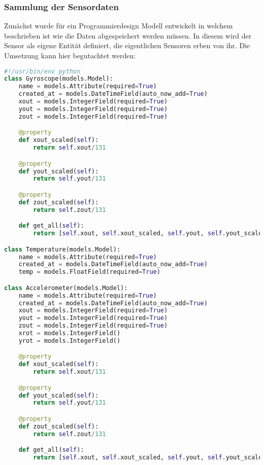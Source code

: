 \subsubsection{Sammlung der Sensordaten}

Zunächst wurde für ein Programmierdesign Modell entwickelt in welchem beschrieben ist wie die Daten abgespeichert werden müssen. In diesem wird der Sensor als eigene Entität definiert, die eigentlichen Sensoren erben von ihr. Die Umsetzung kann hier begutachtet werden:

\begin{lstlisting}[language=Python, caption=Sensorenmodell]
#!/usr/bin/env python
class Gyroscope(models.Model):
    name = models.Attribute(required=True)
    created_at = models.DateTimeField(auto_now_add=True)
    xout = models.IntegerField(required=True)
    yout = models.IntegerField(required=True)
    zout = models.IntegerField(required=True)

    @property
    def xout_scaled(self):
        return self.xout/131

    @property
    def yout_scaled(self):
        return self.yout/131

    @property
    def zout_scaled(self):
        return self.zout/131

    def get_all(self):
        return [self.xout, self.xout_scaled, self.yout, self.yout_scaled, self.zout, self.zout_scaled]

class Temperature(models.Model):
    name = models.Attribute(required=True)
    created_at = models.DateTimeField(auto_now_add=True)
    temp = models.FloatField(required=True)

class Accelerometer(models.Model):
    name = models.Attribute(required=True)
    created_at = models.DateTimeField(auto_now_add=True)
    xout = models.IntegerField(required=True)
    yout = models.IntegerField(required=True)
    zout = models.IntegerField(required=True)
    xrot = models.IntegerField()
    yrot = models.IntegerField()

    @property
    def xout_scaled(self):
        return self.xout/131

    @property
    def yout_scaled(self):
        return self.yout/131

    @property
    def zout_scaled(self):
        return self.zout/131

    def get_all(self):
        return [self.xout, self.xout_scaled, self.yout, self.yout_scaled, self.zout, self.zout_scaled, self.xrot, self.yrot]
\end{lstlisting}

